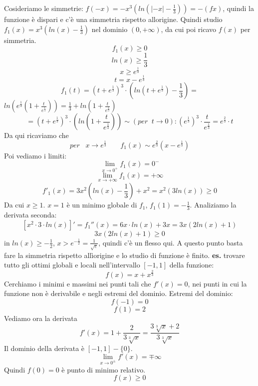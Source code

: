 Cosideriamo le simmetrie: $f(-x) = -x^3(ln(|-x|-\frac{1}{3})) = -(fx)$, quindi la funzione è dispari e c'è una simmetria rispetto allorigine.\newline
Quindi studio $f_1(x) = x^3 ( ln(x) -\frac{1}{3})$ nel dominio $(0, + \infty)$, da cui poi ricavo $f(x)$ per simmetria.
\[
    f_1(x) \geq 0 
\]
\[
    ln(x) \geq \frac{1}{3}
\]
\[
    x \geq e^{\frac{1}{3}}
\]
\[
    t= x-e^{\frac{1}{3}}
\]
\[
    f_1(t) = (t+e^{\frac{1}{3}})^3 \cdot  (ln(t+e^{\frac{1}{3}})-\frac{1}{3})  = 
\]
$ln(e^{\frac{1}{3}}(1+\frac{t}{e^{\frac{1}{3}}})) = \frac{1}{3} + ln(1+\frac{t}{e^{\frac{1}{3}}})$
\[
    = (t+e^{\frac{1}{3}})^3 \cdot  (ln( 1 + \frac{t}{e^{\frac{1}{3}}})) \sim (per \;\; t \rightarrow 0): (e^{\frac{1}{3}})^3 \cdot  \frac{t}{e^{\frac{1}{3}}} =e^{\frac{2}{3}} \cdot t
\]
Da qui ricaviamo che
\[
    per \;\;\; x \rightarrow  e ^{\frac{1}{3}} \;\;\;\;\;\;\; f_1(x) \sim e^{\frac{2}{3}}(x- e ^{\frac{1}{3}})
\]
Poi vediamo i limiti:
\[
    \lim_{x\rightarrow 0^+} f_1(x) = 0^-
\]
\[
    \lim_{x\rightarrow +\infty} f_1(x) = + \infty
\]
\[
    f'_1(x) = 3x^2(ln(x) -\frac{1}{3}) + x^2 = x^2 (3 ln(x) ) \geq 0
\]
Da cui $x \geq 1$. \newline
$x = 1$ è un minimo globale di $f_1$, $f_1(1) =-\frac{1}{3}$.\newline
Analiziamo la derivata seconda:
\[
    [x^2 \cdot  3 \cdot  ln(x)]' = f_1''(x) = 6 x \cdot  ln (x) + 3x = 3x(2 ln(x) +1)
\]
\[
    3x(2 ln(x) +1) \geq 0
\]
in $ln(x) \geq - \frac{1}{2}$, $x > e^{-\frac{1}{2}} = \frac{1}{\sqrt{e}}$, quindi c'è un flesso qui.\newline
A questo punto basta fare la simmetria rispetto allìorigine e lo studio di funzione è finito.\newline
\newline
\newline
\textbf{es.} trovare tutto gli ottimi globali e locali nell'intervallo $[-1,1]$ della funzione:
\[
    f(x) = x+ x^{\frac{2}{3}}
\]
Cerchiamo i minimi e massimi nei punti tali che $f'(x) = 0$, nei punti in cui la funzione non è derivabile e negli estremi del dominio.\newline
Estremi del dominio:
\[
    f(-1) = 0
\]
\[
    f(1) = 2
\]
Vediamo ora la derivata
\[
    f'(x) = 1 + \frac{2}{3 \sqrt[3]{x}} = \frac{3 \sqrt[3]{x} +2}{3 \sqrt[3]{x}}
\]
Il dominio della derivata è $[-1,1] -\{0\}$.
\[
    \lim_{x\rightarrow 0^{\pm}} f'(x) = \mp \infty
\]
Quindi $f(0) = 0$ è punto di minimo relativo.
\[
    f(x) \geq 0
\]
